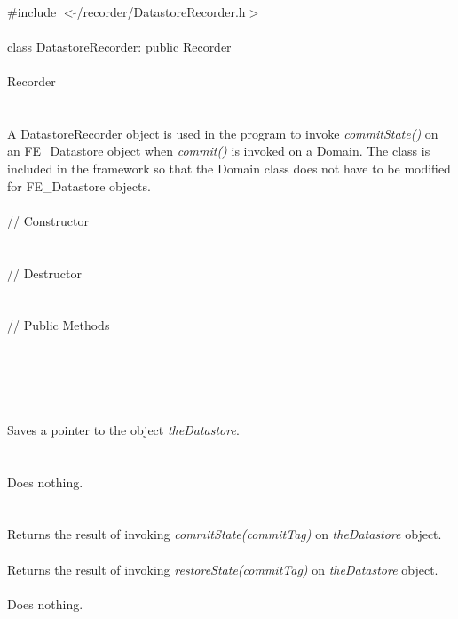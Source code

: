 
   \\
\indent \#include $<\tilde{ }$/recorder/DatastoreRecorder.h$>$  \\

  \\
\indent class DatastoreRecorder: public Recorder\\

 \\
\indent Recorder \\
\indent{} \\

  \\
\noindent A DatastoreRecorder object is used in the program to invoke
{\em commitState()} on an FE\_Datastore object when {\em commit()} is
invoked on a Domain. The class is included in the framework so that
the Domain class does not have to be modified for FE\_Datastore
objects. \\ 


 \\
\indent // Constructor \\
\\ \\ 
\indent // Destructor \\
\\ \\
\indent // Public Methods  \\
\\
\\
\\ 

  \\
\\ 
Saves a pointer to the object {\em theDatastore}. \\

 \\
\\ 
Does nothing. \\

  \\
\\
Returns the result of invoking {\em commitState(commitTag)} on {\em
theDatastore} object. \\ 

\\
Returns the result of invoking {\em restoreState(commitTag)} on {\em
theDatastore} object. \\ 

\\ 
Does nothing.